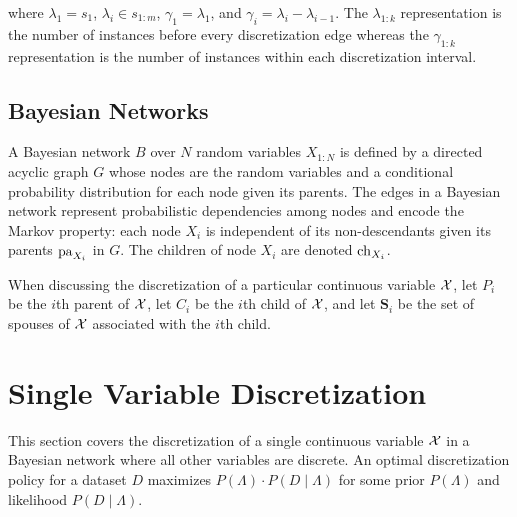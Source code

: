 \noindent
where $\lambda_1 = s_1$, $\lambda_i \in s_{1:m}$, $\gamma_1 = \lambda_1$, and $\gamma_i = \lambda_i - \lambda_{i-1}$.
The $\lambda_{1:k}$ representation is the number of instances before every discretization edge whereas the $\gamma_{1:k}$ representation is the number of instances within each discretization interval.

\subsection{Bayesian Networks}

A Bayesian network $B$ over $N$ random variables $X_{1:N}$ is defined by a directed acyclic graph $G$ whose nodes are the random variables and a conditional probability distribution for each node given its parents.
The edges in a Bayesian network represent probabilistic dependencies among nodes and encode the Markov property: each node $X_i$ is independent of its non-descendants given its parents $\operatorname{pa}_{X_i}$ in $G$.
The children of node $X_i$ are denoted $\operatorname{ch}_{X_i}$.

When discussing the discretization of a particular continuous variable $\mathcal{X}$, let $P_i$ be the $i$th parent of $\mathcal{X}$, let $C_i$ be the $i$th child of $\mathcal{X}$, and let $\bm{S}_i$ be the set of spouses of $\mathcal{X}$ associated with the $i$th child.


\section{Single Variable Discretization}
\label{sec:single_var}

This section covers the discretization of a single continuous variable $\mathcal{X}$ in a Bayesian network where all other variables are discrete.
An optimal discretization policy for a dataset $D$ maximizes $P(\Lambda)\cdot P(D\mid \Lambda)$ for some prior $P(\Lambda)$ and likelihood $P(D\mid \Lambda)$.



